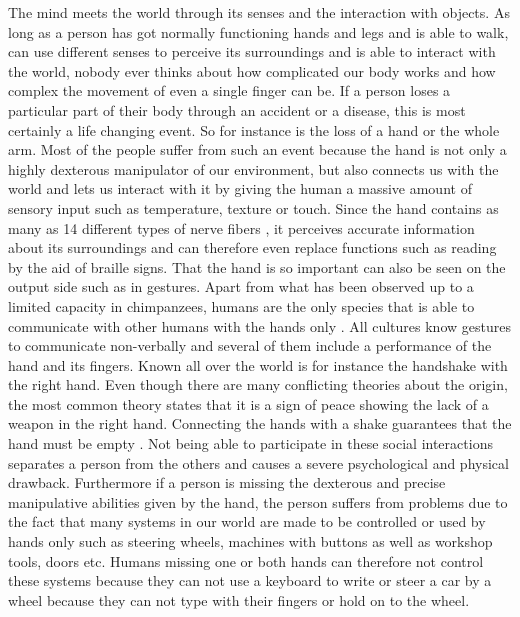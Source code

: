 \documentclass[main]{subfiles}
\begin{document}
The mind meets the world through its senses and the interaction with objects. As long as a person has got normally functioning hands and legs and is able to walk, can use different senses to perceive its surroundings and is able to interact with the world, nobody ever thinks about how complicated our body works and how complex the movement of even a single finger can be. If a person loses a particular part of their body through an accident or a disease, this is most certainly a life changing event. So for instance is the loss of a hand or the whole arm. Most of the people suffer from such an event because the hand is not only a highly dexterous manipulator of our environment, but also connects us with the world and lets us interact with it by giving the human a massive amount of sensory input such as temperature, texture or touch. Since the hand contains as many as 14 different types of nerve fibers \cite{SensoryHand}, it perceives accurate information about its surroundings and can therefore even replace functions such as reading by the aid of braille signs. That the hand is so important can also be seen on the output side such as in gestures. Apart from what has been observed up to a limited capacity in chimpanzees, humans are the only species that is able to communicate with other humans with the hands only \cite{SensoryHand}. All cultures know gestures to communicate non-verbally and several of them include a performance of the hand and its fingers. Known all over the world is for instance the handshake with the right hand. Even though there are many conflicting theories about the origin, the most common theory states that it is a sign of peace showing the lack of a weapon in the right hand. Connecting the hands with a shake guarantees that the hand must be empty \cite{Weapon}. Not being able to participate in these social interactions separates a person from the others and causes a severe psychological and physical drawback. Furthermore if a person is missing the dexterous and precise manipulative abilities given by the hand, the person suffers from problems due to the fact that many systems in our world are made to be controlled or used by hands only such as steering wheels, machines with buttons as well as workshop tools, doors etc. Humans missing one or both hands can therefore not control these systems because they can not use a keyboard to write or steer a car by a wheel because they can not type with their fingers or hold on to the wheel.
\end{document}
